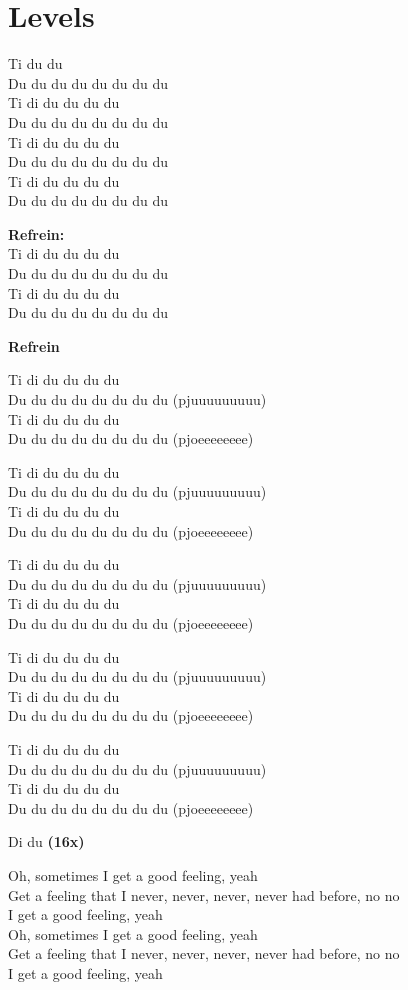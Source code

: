 \section{Levels}
Ti du du\\
Du du du du du du du du\\
Ti di du du du du\\
Du du du du du du du du\\
Ti di du du du du\\
Du du du du du du du du\\
Ti di du du du du\\
Du du du du du du du du

\textbf{Refrein:}\\
Ti di du du du du\\
Du du du du du du du du\\
Ti di du du du du\\
Du du du du du du du du

\textbf{Refrein}

Ti di du du du du\\
Du du du du du du du du (pjuuuuuuuuu)\\
Ti di du du du du\\
Du du du du du du du du (pjoeeeeeeee)

Ti di du du du du\\
Du du du du du du du du (pjuuuuuuuuu)\\
Ti di du du du du\\
Du du du du du du du du (pjoeeeeeeee)

Ti di du du du du\\
Du du du du du du du du (pjuuuuuuuuu)\\
Ti di du du du du\\
Du du du du du du du du (pjoeeeeeeee)

Ti di du du du du\\
Du du du du du du du du (pjuuuuuuuuu)\\
Ti di du du du du\\
Du du du du du du du du (pjoeeeeeeee)

Ti di du du du du\\
Du du du du du du du du (pjuuuuuuuuu)\\
Ti di du du du du\\
Du du du du du du du du (pjoeeeeeeee)

Di du \textbf{(16x)}

Oh, sometimes I get a good feeling, yeah\\
Get a feeling that I never, never, never, never had before, no no\\
I get a good feeling, yeah\\
Oh, sometimes I get a good feeling, yeah\\
Get a feeling that I never, never, never, never had before, no no\\
I get a good feeling, yeah

